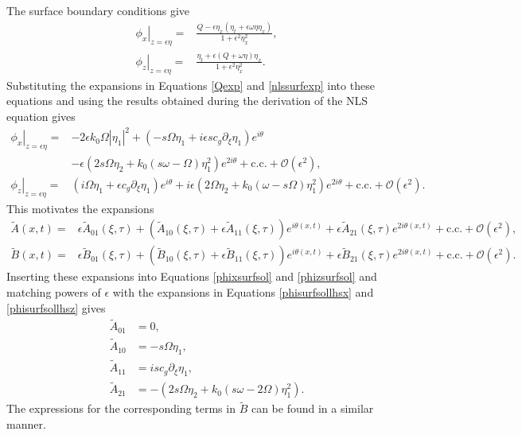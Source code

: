 \documentclass{JFM_Style/jfm}
\newcommand{\pd}{\partial}
\begin{document}
The surface boundary conditions give
\begin{align*}
\left.\phi_{x}\right|_{z=\epsilon\eta} = & \frac{Q-\epsilon\eta_{x}(\eta_{t}+\epsilon\omega\eta\eta_{x})}{1+\epsilon^{2}\eta_{x}^{2}},\\
\left.\phi_{z}\right|_{z=\epsilon\eta} = & \frac{\eta_{t}+\epsilon \left(Q+\omega\eta\right)\eta_{x}}{1+\epsilon^{2}\eta_{x}^{2}}.
\end{align*}
Substituting the expansions in Equations \eqref{Qexp} and \eqref{nlssurfexp} into these equations and using the results obtained during the derivation of the NLS equation gives 
\begin{align}
\left.\phi_{x}\right|_{z=\epsilon\eta} = & -2\epsilon k_{0}\Omega \left|\eta_{1} \right|^{2} + \left(-s\Omega\eta_{1} + i\epsilon s c_{g}\pd_{\xi}\eta_{1} \right)e^{i\theta} \nonumber \\
& - \epsilon(2s\Omega\eta_{2}+ k_{0}(s\omega-\Omega) \eta_{1}^{2})e^{2i\theta} + \mbox{c.c.} + \mathcal{O}(\epsilon^{2}),\label{phisurfsollhsx}\\
\left.\phi_{z}\right|_{z=\epsilon\eta} = & (i\Omega \eta_{1}+\epsilon c_{g}\pd_{\xi}\eta_{1})e^{i\theta} + i\epsilon(2\Omega\eta_{2} + k_{0}(\omega-s\Omega)\eta_{1}^{2})e^{2i\theta} + \mbox{c.c.} + \mathcal{O}(\epsilon^{2}). \label{phisurfsollhsz}
\end{align}
This motivates the expansions
\begin{align*}
\tilde{A}(x,t) = &  \epsilon \tilde{A}_{01}(\xi,\tau) + \left(\tilde{A}_{10}(\xi,\tau) + \epsilon \tilde{A}_{11}(\xi,\tau)\right)e^{i\theta(x,t)} + \epsilon \tilde{A}_{21}(\xi,\tau)e^{2i\theta(x,t)} + \mbox{c.c.} + \mathcal{O}(\epsilon^{2}),\\
\tilde{B}(x,t) = &  \epsilon \tilde{B}_{01}(\xi,\tau) + \left(\tilde{B}_{10}(\xi,\tau) + \epsilon \tilde{B}_{11}(\xi,\tau)\right)e^{i\theta(x,t)} + \epsilon \tilde{B}_{21}(\xi,\tau)e^{2i\theta(x,t)} + \mbox{c.c.} + \mathcal{O}(\epsilon^{2}).
\end{align*}
Inserting these expansions into Equations \eqref{phixsurfsol} and \eqref{phizsurfsol} and matching powers of $\epsilon$ with the expansions in Equations \eqref{phisurfsollhsx} and \eqref{phisurfsollhsz} gives
\begin{align*}
\tilde{A}_{01} & =  0,\\
\tilde{A}_{10} & =  -s\Omega \eta_{1},\\
\tilde{A}_{11} & =  isc_{g}\pd_{\xi}\eta_{1},\\
\tilde{A}_{21} & =  -(2s\Omega \eta_{2} + k_{0}(s\omega - 2\Omega)\eta_{1}^{2}).
\end{align*}
The expressions for the corresponding terms in $\tilde{B}$ can be found in a similar manner.  
\end{document}
